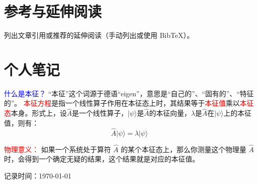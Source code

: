 \documentclass[11pt,a4paper]{article}
\begin{document}
\section{参考与延伸阅读}
% 
% 
列出文章引用或推荐的延伸阅读（手动列出或使用 BibTeX）。

\section{个人笔记 }
\textcolor{blue}{什么是本征？}
“本征”这个词源于德语“eigen”，意思是“自己的”、“固有的”、“特征的”。
\textcolor{red}{本征方程}是指一个线性算子作用在本征态上时，其结果等于\textcolor{red}{本征值}乘以\textcolor{red}{本征态}本身。形式上，设$\hat{A}$是一个线性算子，$| \psi \rangle$是$\hat{A}$的本征向量，$\lambda$是$\hat{A}$在$| \psi \rangle$上的本征值，则有：
\begin{equation}
\hat{A} | \psi \rangle = \lambda | \psi \rangle
\end{equation}

\textcolor{red}{物理意义：}
如果一个系统处于算符 $\hat{A}$ 的某个本征态上，那么你测量这个物理量 $\hat{A}$ 时，会得到一个确定无疑的结果，这个结果就是对应的本征值。

\vfill
{\small 记录时间：\today\ \currenttime}
\end{document}
